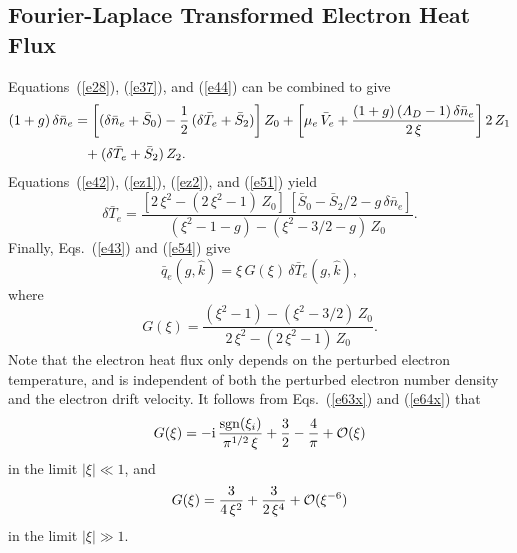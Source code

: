 \documentclass[12pt,prb,aps]{revtex4-1}
\begin{document}
\subsection{Fourier-Laplace Transformed Electron Heat Flux}
Equations~(\ref{e28}), (\ref{e37}), and (\ref{e44}) can be combined to give
\begin{align}\label{e51}
(1+g)\,\delta\bar{n}_e&=\left[(\delta\bar{n}_e+\bar{S}_0)-\frac{1}{2}\,(\delta\bar{T}_e+\bar{S}_2)\right]Z_0+\left[\mu_e\,\bar{V}_e+\frac{(1+g)\,({\mit\Lambda}_D-1)\,\delta\bar{n}_e}{2\,\xi}\right]2\,Z_1\nonumber\\[0.5ex]
&\phantom{=}
+(\delta\bar{T}_e+\bar{S}_2)\,Z_2.
\end{align}
Equations~(\ref{e42}), (\ref{ez1}), (\ref{ez2}), and (\ref{e51})
yield
\begin{equation}\label{e54}
\delta\bar{T}_e = \frac{[2\,\xi^2-(2\,\xi^2-1)\,Z_0]\,[\bar{S}_0-\bar{S}_2/2-g\,\delta\bar{n}_e]}{
(\xi^2-1-g)-(\xi^2-3/2-g)\,Z_0}.
\end{equation}
Finally, Eqs.~(\ref{e43}) and (\ref{e54}) give\,\cite{haz}
\begin{equation}\label{e55}
\bar{q}_e(g,\hat{k}) = \xi\,G(\xi)\,\delta\bar{T}_e(g,\hat{k}),
\end{equation}
where
\begin{equation}\label{e56}
G(\xi) = \frac{(\xi^2-1)-(\xi^2-3/2)\,Z_0}{2\,\xi^2-(2\,\xi^2-1)\,Z_0}.
\end{equation}
Note that the electron heat flux only depends on the perturbed electron temperature, and is independent of both the
perturbed electron number density and the electron drift velocity. 
It follows from Eqs.~(\ref{e63x}) and (\ref{e64x}) that
\begin{equation}\label{lmfp}
G(\xi) =-{\rm i}\,\frac{{\rm sgn}(\xi_i)}{\pi^{1/2}\,\xi}+\frac{3}{2}-\frac{4}{\pi}+{\cal O}(\xi)
\end{equation}
in the limit $|\xi|\ll 1$, and 
\begin{equation}\label{smfp}
G(\xi)= \frac{3}{4\,\xi^2} + \frac{3}{2\,\xi^4} + {\cal O}(\xi^{-6}) 
\end{equation}
in the limit $|\xi|\gg 1$. 
\end{document}
